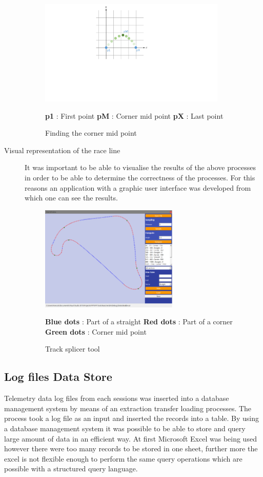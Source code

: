 \begin{description}
	\begin{figure}[!htb]
		\centering
		\includegraphics[height=5cm]{diagrams/cornerMidPoint.pdf}
		\caption[Corner mid point]{Finding the corner mid point}
		\textbf{p1} : First point \textbf{pM} : Corner mid point \textbf{pX} : Last point
		\label{fig:diagram-cornerMidPoint}
	\end{figure}
	
	\item [Visual representation of the race line] It was important to be able to visualise the results of the above processes in order to be able to determine the correctness of the processes. For this reasons an application with a graphic user interface was developed from which one can see the results.
	
	\begin{figure}[!htb]
		\centering
		\includegraphics[height=5cm]{images/tracksplicertool}
		\caption{Track splicer tool}
		\textbf{Blue dots} : Part of a straight \textbf{Red dots} : Part of a corner \textbf{Green dots} : Corner mid point
		\label{fig:TrackSplicerTool}
	\end{figure}
	
\end{description}

\subsection{Log files Data Store}
Telemetry data log files from each sessions was inserted into a database management system by means of an extraction transfer loading processes. The process took a log file as an input and inserted the records into a table. By using a database management system it was possible to be able to store and query large amount of data in an efficient way. At first Microsoft Excel was being used however there were too many records to be stored in one sheet, further more the excel is not flexible enough to perform the same query operations which are possible with a structured query language.

